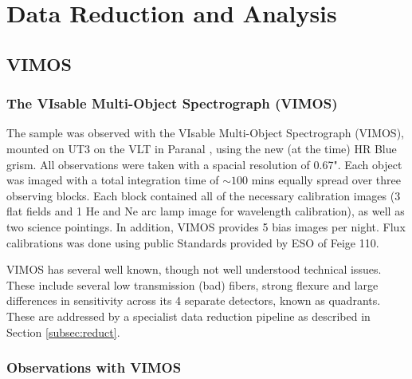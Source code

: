 \chapter{Data Reduction and Analysis}
	\label{cha:Data}


\section{VIMOS}
	\label{sec:VIMOS}
	\subsection{The VIsable Multi-Object Spectrograph (VIMOS)}
		The sample was observed with the VIsable Multi-Object Spectrograph (VIMOS), mounted on UT3 on the VLT in Paranal \citep{LeFevre2003}, using the new (at the time) HR Blue grism. All observations were taken with a spacial resolution of 0.67". Each object was imaged with a total integration time of $\sim 100$ mins equally spread over three observing blocks. Each block contained all of the necessary calibration images (3 flat fields and 1 He and Ne arc lamp image for wavelength calibration), as well as two science pointings. In addition, VIMOS provides 5 bias images per night. Flux calibrations was done using public Standards provided by ESO of Feige 110.

		VIMOS has several well known, though not well understood technical issues. These include several low transmission (bad) fibers, strong flexure and large differences in sensitivity across its 4 separate detectors, known as quadrants. These are addressed by a specialist data reduction pipeline as described in Section \ref{subsec:reduct}. 

	\subsection{Observations with VIMOS}
